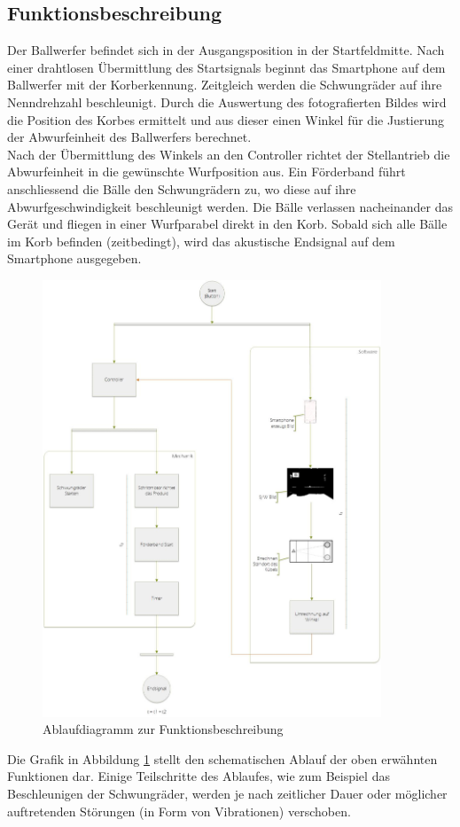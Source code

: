 \subsection{Funktionsbeschreibung}
Der Ballwerfer befindet sich in der Ausgangsposition in der Startfeldmitte. 
Nach einer drahtlosen Übermittlung des Startsignals beginnt das Smartphone auf 
dem Ballwerfer mit der Korberkennung. Zeitgleich werden die Schwungräder auf ihre Nenndrehzahl beschleunigt.
Durch die Auswertung des fotografierten Bildes wird die Position des Korbes ermittelt und aus dieser einen 
Winkel für die Justierung der Abwurfeinheit des Ballwerfers berechnet.\\
Nach der Übermittlung des Winkels an den Controller richtet der Stellantrieb die Abwurfeinheit in die gewünschte Wurfposition aus. 
Ein Förderband führt anschliessend die Bälle den Schwungrädern zu, wo diese auf ihre Abwurfgeschwindigkeit beschleunigt werden. 
Die Bälle verlassen nacheinander das Gerät und fliegen in einer Wurfparabel direkt in den Korb. Sobald sich alle Bälle im Korb befinden (zeitbedingt),
wird das akustische Endsignal auf dem Smartphone ausgegeben.
\newpage
\begin{figure}[h!]
	\centering
	\includegraphics[width=0.9\textwidth]{Enddokumentation/Loesungskonzept/Bilder/FlowOnChart_v2.jpg}
	\caption{Ablaufdiagramm zur Funktionsbeschreibung}
	\label{fig:FlowChart}
\end{figure}
\noindent Die Grafik in Abbildung \ref{fig:FlowChart} stellt den schematischen Ablauf der oben erwähnten Funktionen dar. 
Einige Teilschritte des Ablaufes, wie zum Beispiel das Beschleunigen der Schwungräder, werden 
je nach zeitlicher Dauer oder möglicher auftretenden Störungen (in Form von Vibrationen) verschoben.